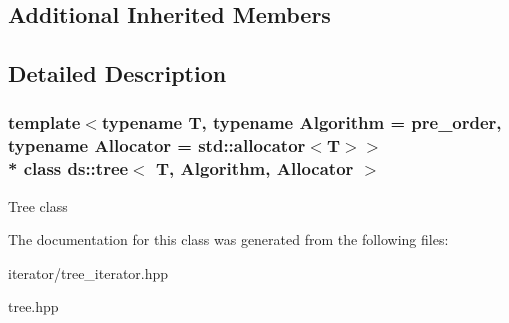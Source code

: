 \subsection*{Additional Inherited Members}


\subsection{Detailed Description}
\subsubsection*{template$<$typename T, typename Algorithm = pre\+\_\+order, typename Allocator = std\+::allocator$<$\+T$>$$>$\\*
class ds\+::tree$<$ T, Algorithm, Allocator $>$}

Tree class 

The documentation for this class was generated from the following files\+:\begin{DoxyCompactItemize}
\item 
iterator/tree\+\_\+iterator.\+hpp\item 
tree.\+hpp\end{DoxyCompactItemize}
